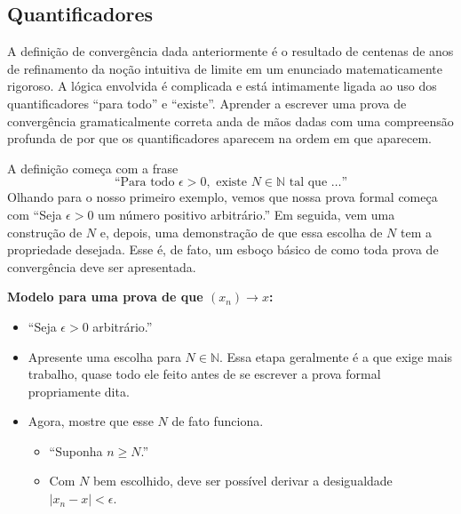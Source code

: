 \subsection{Quantificadores}

A definição de convergência dada anteriormente é o resultado de centenas de anos de refinamento da noção intuitiva de limite em um enunciado matematicamente rigoroso. A lógica envolvida é complicada e está intimamente ligada ao uso dos quantificadores ``para todo'' e ``existe''. Aprender a escrever uma prova de convergência gramaticalmente correta anda de mãos dadas com uma compreensão profunda de por que os quantificadores aparecem na ordem em que aparecem.

A definição começa com a frase
\[
\text{``Para todo } \epsilon > 0, \text{ existe } N \in \mathbb{N} \text{ tal que } \dots\text{''}
\]
Olhando para o nosso primeiro exemplo, vemos que nossa prova formal começa com ``Seja $\epsilon > 0$ um número positivo arbitrário.'' Em seguida, vem uma construção de $N$ e, depois, uma demonstração de que essa escolha de $N$ tem a propriedade desejada. Esse é, de fato, um esboço básico de como toda prova de convergência deve ser apresentada.

\textbf{Modelo para uma prova de que $(x_n) \to x$:}
\begin{itemize}
\item ``Seja $\epsilon > 0$ arbitrário.''
\item Apresente uma escolha para $N \in \mathbb{N}$. Essa etapa geralmente é a que exige mais trabalho, quase todo ele feito antes de se escrever a prova formal propriamente dita.
\item Agora, mostre que esse $N$ de fato funciona.
  \begin{itemize}
  \item ``Suponha $n \geq N$.''
  \item Com $N$ bem escolhido, deve ser possível derivar a desigualdade $|x_n - x| < \epsilon$.
  \end{itemize}
\end{itemize}

